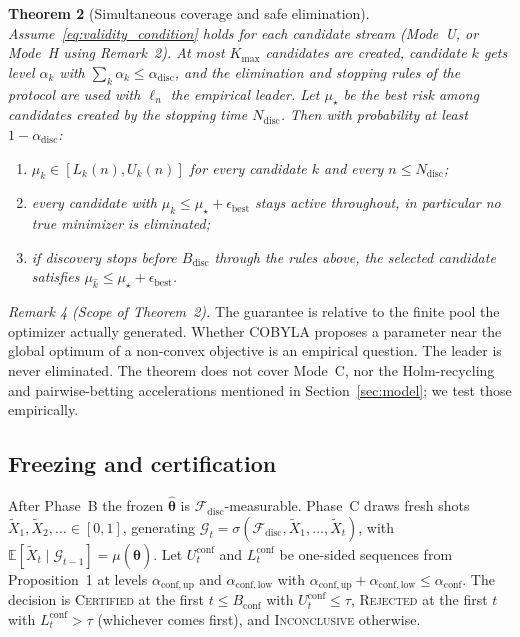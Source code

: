 \documentclass[a4paper,onecolumn,unpublished]{quantumarticle}
\newcommand{\E}{\mathbb{E}}
\newcommand{\G}{\mathcal{G}}
\newcommand{\Fdisc}{\mathcal{F}_{\mathrm{disc}}}
\newcommand{\Bdisc}{B_{\mathrm{disc}}}
\newcommand{\Bconf}{B_{\mathrm{conf}}}
\newcommand{\Ndisc}{N_{\mathrm{disc}}}
\newcommand{\adisc}{\alpha_{\mathrm{disc}}}
\newcommand{\aconf}{\alpha_{\mathrm{conf}}}
\newcommand{\aup}{\alpha_{\mathrm{conf,up}}}
\newcommand{\alow}{\alpha_{\mathrm{conf,low}}}
\newcommand{\epsbest}{\epsilon_{\mathrm{best}}}
\newcommand{\Kmax}{K_{\max}}
\newcommand{\thhat}{\widehat{\bm{\theta}}}
\begin{document}
\medskip\noindent\textbf{Theorem 2} (Simultaneous coverage and safe elimination).\label{thm:elimination}
\emph{Assume~\eqref{eq:validity_condition} holds for each candidate stream (Mode~U, or Mode~H using Remark~2). At most $\Kmax$ candidates are created, candidate $k$ gets level $\alpha_k$ with $\textstyle\sum_k \alpha_k \le \adisc$, and the elimination and stopping rules of the protocol are used with $\ell_n$ the empirical leader. Let $\mu_\star$ be the best risk among candidates created by the stopping time $\Ndisc$. Then with probability at least $1 - \adisc$:}
\begin{enumerate}
  \item[\emph{(a)}] \emph{$\mu_k \in [L_k(n), U_k(n)]$ for every candidate $k$ and every $n \le \Ndisc$;}
  \item[\emph{(b)}] \emph{every candidate with $\mu_k \le \mu_\star + \epsbest$ stays active throughout, in particular no true minimizer is eliminated;}
  \item[\emph{(c)}] \emph{if discovery stops before $\Bdisc$ through the rules above, the selected candidate satisfies $\mu_{\hat k} \le \mu_\star + \epsbest$.}
\end{enumerate}

\medskip\noindent\emph{Remark 4 (Scope of Theorem~2).}\label{rem:scope_thm2}
The guarantee is relative to the finite pool the optimizer actually generated. Whether COBYLA proposes a parameter near the global optimum of a non-convex objective is an empirical question. The leader is never eliminated. The theorem does not cover Mode~C, nor the Holm-recycling and pairwise-betting accelerations mentioned in Section~\ref{sec:model}; we test those empirically.

\subsection{Freezing and certification}
\label{subsec:freezing_certification}

After Phase~B the frozen $\thhat$ is $\Fdisc$-measurable. Phase~C draws fresh shots $\widetilde X_1, \widetilde X_2, \dots \in [0, 1]$, generating $\G_t = \sigma(\Fdisc, \widetilde X_1, \dots, \widetilde X_t)$, with $\E[\widetilde X_t \mid \G_{t-1}] = \mu(\thhat)$. Let $U_t^{\mathrm{conf}}$ and $L_t^{\mathrm{conf}}$ be one-sided sequences from Proposition~1 at levels $\aup$ and $\alow$ with $\aup + \alow \le \aconf$. The decision is \textup{\textsc{Certified}} at the first $t \le \Bconf$ with $U_t^{\mathrm{conf}} \le \tau$, \textup{\textsc{Rejected}} at the first $t$ with $L_t^{\mathrm{conf}} > \tau$ (whichever comes first), and \textup{\textsc{Inconclusive}} otherwise.
\end{document}
